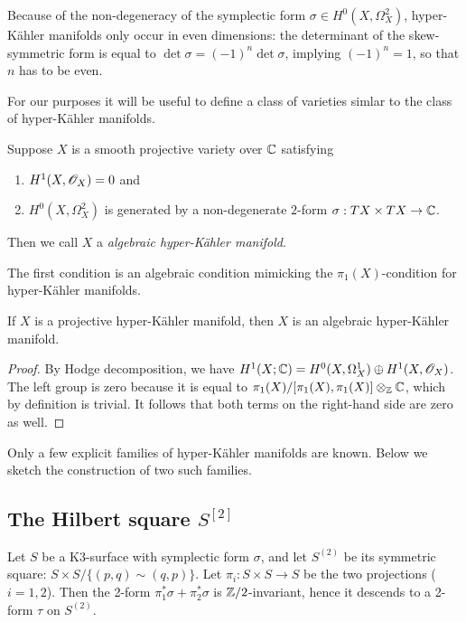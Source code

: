 Because of the non-degeneracy of the symplectic form $\sigma \in H^0(X, \Omega_X^2)$, hyper-Kähler manifolds only occur in even dimensions: the determinant of the skew-symmetric form is equal to $\det \sigma = (-1)^n \det \sigma$, implying $(-1)^n=1$, so that $n$ has to be even.

For our purposes it will be useful to define a  class of varieties simlar to the class of hyper-Kähler manifolds.

\begin{definition}
Suppose $X$ is a smooth projective variety over $\mathbb{C}$ satisfying

\begin{enumerate}
\item $H^1(X,\mathscr{O}_X)=0$ and
\item $H^0(X,\Omega_X^2)$ is generated by a non-degenerate $2$-form $\sigma:TX \times TX \to \mathbb{C}$.
\end{enumerate}

Then we call $X$ a \emph{algebraic hyper-Kähler manifold}.
\end{definition}

The first condition is an algebraic condition mimicking the $\pi_1(X)$-condition for hyper-Kähler manifolds.

\begin{proposition}
 If $X$ is a projective hyper-Kähler manifold, then $X$ is an algebraic hyper-Kähler manifold.
\end{proposition}
\begin{proof}
By Hodge decomposition, we have $H^1(X;\mathbb{C}) = H^0(X,\Omega^1_X) \oplus H^1(X,\mathscr{O}_X)$. The left group is zero because it is equal to $\pi_1(X)/[\pi_1(X),\pi_1(X)] \otimes_{\mathbb{Z}} \mathbb{C}$, which by definition is trivial. It follows that both terms on the right-hand side are zero as well.
\end{proof}

Only a few explicit families of hyper-Kähler manifolds are known. Below we sketch the construction of two such families.

\subsection{The Hilbert square $S^{[2]}$}

Let $S$ be a K3-surface with symplectic form $\sigma$, and let $S^{(2)}$ be its symmetric square: $S \times S / \{ (p,q) \sim (q,p) \}$. Let $\pi_i:S \times S \to S$ be the two projections ($i=1,2$). Then the 2-form $\pi_1^\ast \sigma + \pi_2^\ast \sigma$ is $\mathbb{Z}/2$-invariant, hence it descends to a 2-form  $\tau$ on $S^{(2)}$.

